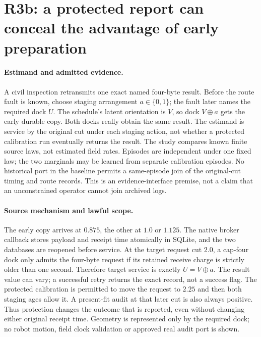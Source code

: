 \documentclass{article}
\begin{document}
\section*{R3b: a protected report can conceal the advantage of early preparation}
\paragraph{Estimand and admitted evidence.}
A civil inspection retransmits one exact named four-byte result.
Before the route fault is known, choose staging arrangement \(a\in\{0,1\}\);
the fault later names the required dock \(U\). The schedule's latent
orientation is \(V\), so dock \(V\mathbin{\oplus}a\) gets the early
durable copy. Both docks really obtain the same result. The estimand
is service by the original cut under each staging action, not whether
a protected calibration run eventually returns the result. The study
compares known finite source laws, not estimated field rates. Episodes
are independent under one fixed law; the two marginals may be learned
from separate calibration episodes. No historical port in the baseline
permits a same-episode join of the original-cut timing and route records.
This is an evidence-interface premise, not a claim that an unconstrained
operator cannot join archived logs.

\paragraph{Source mechanism and lawful scope.}
The early copy arrives at \(0.875\), the other at \(1.0\) or \(1.125\).
The native broker callback stores payload and receipt time atomically
in SQLite, and the two databases are reopened before service.
At the target request cut \(2.0\), a cap-four dock only admits the
four-byte request if its retained receive charge is strictly older
than one second. Therefore target service is exactly
\(U=V\mathbin{\oplus}a\). The result value can vary; a successful
retry returns the exact record, not a success flag. The protected
calibration is permitted to move the request to \(2.25\) and then both
staging ages allow it. A present-fit audit at that later cut is
also always positive. Thus protection changes the outcome that is
reported, even without changing either original receipt time.
Geometry is represented only by the required dock; no robot motion,
field clock validation or approved real audit port is shown.
\end{document}
